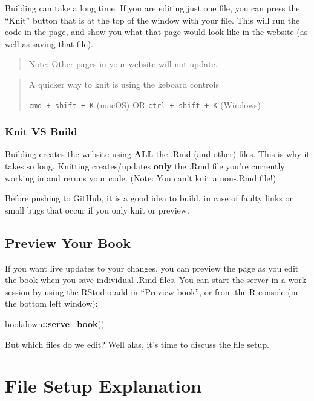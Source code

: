 \documentclass[
]{book}
\newenvironment{Shaded}{\begin{snugshade}}{\end{snugshade}}
\newcommand{\FunctionTok}[1]{\textcolor[rgb]{0.13,0.29,0.53}{\textbf{#1}}}
\newcommand{\NormalTok}[1]{#1}
\newcommand{\SpecialCharTok}[1]{\textcolor[rgb]{0.81,0.36,0.00}{\textbf{#1}}}
\theoremstyle{definition}
\theoremstyle{definition}
\theoremstyle{definition}
\theoremstyle{definition}
\theoremstyle{remark}
\begin{document}
Building can take a long time. If you are editing just one file, you can press the ``Knit'' button that is at the top of the window with your file. This will run the code in the page, and show you what that page would look like in the website (as well as saving that file).

\begin{quote}
Note: Other pages in your website will not update.
\end{quote}

\begin{quote}
A quicker way to knit is using the keboard controls

\texttt{cmd\ +\ shift\ +\ K} (macOS) OR \texttt{ctrl\ +\ shift\ +\ K} (Windows)
\end{quote}

\subsubsection{Knit VS Build}\label{knit-vs-build}

Building creates the website using \textbf{ALL} the .Rmd (and other) files. This is why it takes so long. Knitting creates/updates \textbf{only} the .Rmd file you're currently working in and reruns your code. (Note: You can't knit a non-.Rmd file!)

Before pushing to GitHub, it is a good idea to build, in case of faulty links or small bugs that occur if you only knit or preview.

\subsection{Preview Your Book}\label{preview-your-book}

If you want live updates to your changes, you can preview the page as you edit the book when you save individual .Rmd files. You can start the server in a work session by using the RStudio add-in ``Preview book'', or from the R console (in the bottom left window):

\begin{Shaded}
\begin{Highlighting}[]
\NormalTok{bookdown}\SpecialCharTok{::}\FunctionTok{serve\_book}\NormalTok{()}
\end{Highlighting}
\end{Shaded}

But which files do we edit? Well alas, it's time to discuss the file setup.

\section{File Setup Explanation}\label{file-setup}
\end{document}
